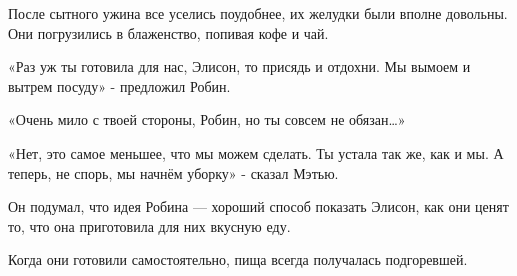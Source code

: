\documentclass[a4paper,12pt]{book}
\begin{document}
После сытного ужина все уселись поудобнее, их желудки были вполне довольны. Они погрузились в блаженство, попивая кофе и чай.
\par
«Раз уж ты готовила для нас, Элисон, то присядь и отдохни. Мы вымоем и вытрем посуду» - предложил Робин.
\par
«Очень мило с твоей стороны, Робин, но ты совсем не обязан…»
\par
«Нет, это самое меньшее, что мы можем сделать. Ты устала так же, как и мы. А теперь, не спорь, мы начнём уборку» - сказал Мэтью.
\par
Он подумал, что идея Робина — хороший способ показать Элисон, как они ценят то, что она приготовила для них вкусную еду.
\par
Когда они готовили самостоятельно, пища всегда получалась подгоревшей.
\end{document}
